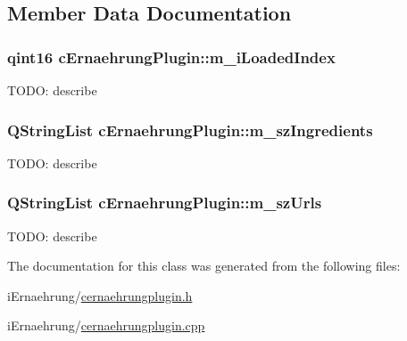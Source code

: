 \subsection{Member Data Documentation}
\subsubsection[{\texorpdfstring{m\+\_\+i\+Loaded\+Index}{m_iLoadedIndex}}]{\setlength{\rightskip}{0pt plus 5cm}qint16 c\+Ernaehrung\+Plugin\+::m\+\_\+i\+Loaded\+Index\hspace{0.3cm}{\ttfamily [private]}}\hypertarget{classc_ernaehrung_plugin_a947339aef16691c4165c7eb1869d3b7e}{}\label{classc_ernaehrung_plugin_a947339aef16691c4165c7eb1869d3b7e}
T\+O\+DO\+: describe 
\subsubsection[{\texorpdfstring{m\+\_\+sz\+Ingredients}{m_szIngredients}}]{\setlength{\rightskip}{0pt plus 5cm}Q\+String\+List c\+Ernaehrung\+Plugin\+::m\+\_\+sz\+Ingredients\hspace{0.3cm}{\ttfamily [private]}}\hypertarget{classc_ernaehrung_plugin_aa586d90efc11b68dce605fdf1a45910d}{}\label{classc_ernaehrung_plugin_aa586d90efc11b68dce605fdf1a45910d}
T\+O\+DO\+: describe 
\subsubsection[{\texorpdfstring{m\+\_\+sz\+Urls}{m_szUrls}}]{\setlength{\rightskip}{0pt plus 5cm}Q\+String\+List c\+Ernaehrung\+Plugin\+::m\+\_\+sz\+Urls\hspace{0.3cm}{\ttfamily [private]}}\hypertarget{classc_ernaehrung_plugin_a58692dcfff3d8f9da462b90fbf12db06}{}\label{classc_ernaehrung_plugin_a58692dcfff3d8f9da462b90fbf12db06}
T\+O\+DO\+: describe 

The documentation for this class was generated from the following files\+:\begin{DoxyCompactItemize}
\item 
i\+Ernaehrung/\hyperlink{cernaehrungplugin_8h}{cernaehrungplugin.\+h}\item 
i\+Ernaehrung/\hyperlink{cernaehrungplugin_8cpp}{cernaehrungplugin.\+cpp}\end{DoxyCompactItemize}
